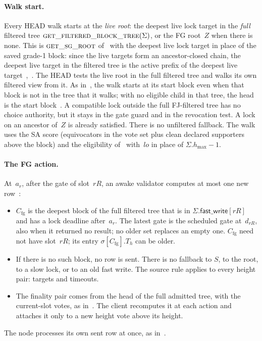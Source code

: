 \documentclass{article}
\theoremstyle{plain}
\theoremstyle{definition}
\theoremstyle{remark}
\newcommand{\hmax}{h_{\max}}
\newcommand{\Cfg}{C_{\mathrm{fg}}}
\newcommand{\lo}{\mathit{lo}}
\newcommand{\fastWrite}{\mathsf{fast\_write}}
\newcommand{\DC}[1]{\cite[\S#1]{DC}}
\newcommand{\FAST}[1]{\cite[\S#1]{FAST}}
\newcommand{\LDP}[1]{\cite[\S#1]{LDP}}
\begin{document}
\paragraph{Walk start.}  Every HEAD walk starts at the \emph{live root}: the
deepest live lock target in the \emph{full} filtered tree
$\Call{get\_filtered\_block\_tree}{\Sigma}$, or the FG root~$Z$ when
there is none.  This is $\Call{get\_sg\_root}{}$ of~\DC{7} with the
deepest live lock target in place of the saved grade-1 block: since
the live targets form an ancestor-closed chain, the deepest live target
in the filtered tree is the active prefix of the deepest live
target~\LDP{1},~\cite[\S4]{ALFS}.  The HEAD tests the live root in the full filtered
tree and walks its own filtered view from it.  As in~\cite{DC}, the walk
starts at its start block even when that block is not in the tree that
it walks; with no eligible child in that tree, the head is the start
block~\cite[\S5]{DC}.  A compatible lock outside the full FJ-filtered tree has no
choice authority, but it stays in the gate guard and in the revocation
test.  A lock on an ancestor of~$Z$ is already satisfied.  There is no
unfiltered fallback.  The walk uses the SA score (equivocators in the vote set plus
clean declared supporters above the block) and the eligibility
of~\DC{5} with~$\lo$ in place of $\Sigma.\hmax-1$.

\paragraph{The FG action.}  At~$a_r$, after the gate of slot~$rR$, an
awake validator computes at most one new row~\FAST{3}:
\begin{itemize}[nosep]
\item $\Cfg$ is the deepest block of the full filtered tree that is in
  $\Sigma.\fastWrite[rR]$ and has a lock deadline after~$a_r$.  The
  latest gate is the scheduled gate at~$d_{rR}$, also when it returned
  no result; no older set replaces an empty one.  $\Cfg$ need not have
  slot~$rR$; its entry $\sigma[\Cfg].T_h$ can be older.
\item If there is no such block, no row is sent.  There is no
  fallback to $S$, to the root, to a slow lock, or to an old fast
  write.  The source rule applies to every height pair: targets
  and timeouts.
\item The finality pair comes from the head of the full admitted tree,
  with the current-slot votes, as in~\DC{7}.  The client recomputes it
  at each action and attaches it only to a new height vote above its height.
\end{itemize}
The node processes its own sent row at once, as in~\DC{7}.
\end{document}
